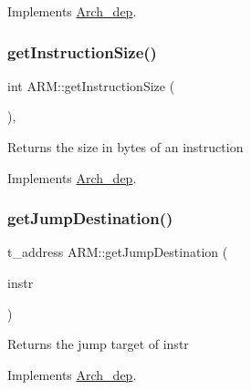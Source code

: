 Implements \hyperlink{classArch__dep_ae9c1e0474e6414808dc6c8658ef0ddba}{Arch\+\_\+dep}.

\mbox{\label{classARM_a1eb1efd95035b2a16f65bb1f58916e7b}} 
\subsubsection{\texorpdfstring{get\+Instruction\+Size()}{getInstructionSize()}}
{\footnotesize\ttfamily int A\+R\+M\+::get\+Instruction\+Size (\begin{DoxyParamCaption}{ }\end{DoxyParamCaption})\hspace{0.3cm}{\ttfamily [inline]}, {\ttfamily [virtual]}}

Returns the size in bytes of an instruction 

Implements \hyperlink{classArch__dep_a845395b8503a23b2c192e8b4a05ccba9}{Arch\+\_\+dep}.

\mbox{\label{classARM_ae889878d4d427bda74ca75645ca0f35a}} 
\subsubsection{\texorpdfstring{get\+Jump\+Destination()}{getJumpDestination()}}
{\footnotesize\ttfamily t\+\_\+address A\+R\+M\+::get\+Jump\+Destination (\begin{DoxyParamCaption}\item[{const \hyperlink{classObjdumpInstruction}{Objdump\+Instruction} \&}]{instr }\end{DoxyParamCaption})\hspace{0.3cm}{\ttfamily [virtual]}}

Returns the jump target of instr 

Implements \hyperlink{classArch__dep_a78780a4581807e2974057810e6aaa6c1}{Arch\+\_\+dep}.

\mbox{\label{classARM_acb46d6be8fd6799ed147be2b86991897}} 
